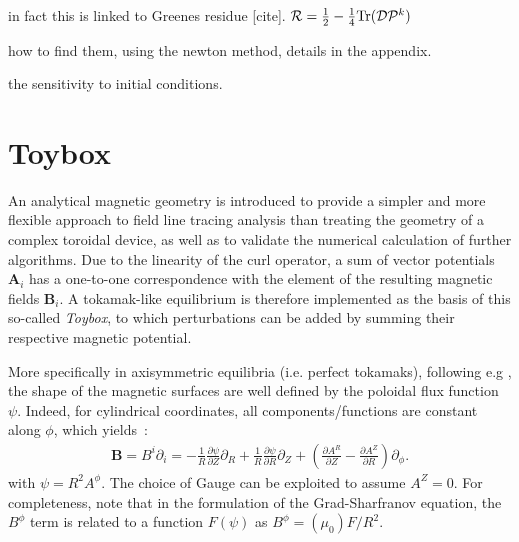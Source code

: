 in fact this is linked to Greenes residue [cite].
$\mathcal{R} = \frac{1}{2} - \frac{1}{4}\text{Tr}(\mathcal{D}\mathcal{P}^k)$

how to find them, using the newton method, details in the appendix.

the sensitivity to initial conditions.

\chapter{Toybox}
An analytical magnetic geometry is introduced to provide a simpler and more flexible approach to field line tracing analysis than treating the geometry of a complex toroidal device, as well as to validate the numerical calculation of further algorithms. Due to the linearity of the curl operator, a sum of vector potentials $\textbf{A}_i$ has a one-to-one correspondence with the element of the resulting magnetic fields $\textbf{B}_i$. A tokamak-like equilibrium is therefore implemented as the basis of this so-called \textit{Toybox}, to which perturbations can be added by summing their respective magnetic potential.

More specifically in axisymmetric equilibria (i.e. perfect tokamaks), following e.g \cite[p.108]{wesson_tokamaks_2011}, the shape of the magnetic surfaces are well defined by the poloidal flux function $\psi$. Indeed, for cylindrical coordinates, all components/functions are constant along $\phi$, which yields~:
\begin{align*}
    \textbf{B} = B^i\partial_i = -\frac{1}{R}\frac{\partial\psi}{\partial Z}\partial_R +\frac{1}{R}\frac{\partial\psi}{\partial R}\partial_Z + \left(\frac{\partial A^R}{\partial Z} - \frac{\partial A^Z}{\partial R}\right)\partial_\phi.
\end{align*}
with $\psi = R^2 A^\phi$. The choice of Gauge can be exploited to assume $A^Z = 0$. For completeness, note that in the formulation of the Grad-Sharfranov equation, the $B^\phi$ term is related to a function $F(\psi)$ as $B^\phi = (\mu_0) F/R^2$.

